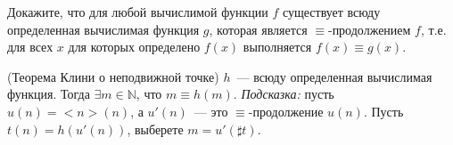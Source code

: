 \begin{enumcyr}
	\item Докажите, что для любой вычислимой функции $f$ существует всюду определенная вычислимая функция $g$, которая
    	является $\equiv$-продолжением $f$, т.е. для всех $x$ для которых определено $f(x)$ выполняется $f(x) \equiv g(x)$.
    \item (Теорема Клини о неподвижной точке) $h$~--- всюду определенная вычислимая функция. Тогда $\exists m \in
	    \mathbb{N}$, что $m \equiv h(m)$. \textit{Подсказка:} пусть $u(n) = {<n>} (n)$, а $u'(n)$~--- это
        $\equiv$-продолжение $u(n)$. Пусть $t(n) = h(u'(n))$, выберете $m = u'(\sharp t)$.
\end{enumcyr}
